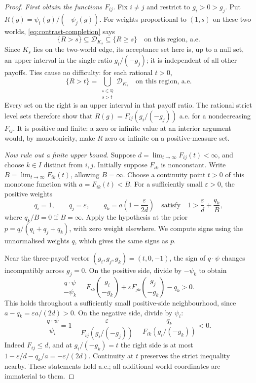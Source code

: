 \documentclass[11pt]{article}
\theoremstyle{remark}
\newcommand{\Dscr}{\mathcal D}
\begin{document}
\begin{proof}
\emph{First obtain the functions $F_{ij}$.}
Fix $i\ne j$ and restrict to $g_i>0>g_j$. Put
$R(g)=\psi_i(g)/(-\psi_j(g))$.
For weights proportional to $(1,s)$ on these two worlds,
\eqref{eq:contrast-completion} says
\[
 \{R>s\}\subseteq\Dscr_{K_s}\subseteq\{R\ge s\}
 \quad\text{on this region, a.e.}
\]
Since $K_s$ lies on the two-world edge, its acceptance set here is, up to a
null set, an upper interval in the single ratio $g_i/(-g_j)$; it is
independent of all other payoffs. Ties cause no difficulty: for each
rational $t>0$,
\[
 \{R>t\}=\bigcup_{\substack{s\in\mathbb Q\\s>t}}\Dscr_{K_s}
 \quad\text{on this region, a.e.}
\]
Every set on the right is an upper interval in that payoff ratio.
The rational strict level sets therefore show that
$R(g)=F_{ij}(g_i/(-g_j))$ a.e. for a nondecreasing $F_{ij}$.
It is positive and finite: a zero or infinite value at an interior argument
would, by monotonicity, make $R$ zero or infinite on a positive-measure set.

\emph{Now rule out a finite upper bound.}
Suppose $d=\lim_{t\to\infty}F_{ij}(t)<\infty$, and choose $k\in I$ distinct
from $i,j$. Initially suppose $F_{ik}$ is nonconstant. Write
$B=\lim_{t\to\infty}F_{ik}(t)$, allowing $B=\infty$.
Choose a continuity point $t>0$ of this monotone function with
$a=F_{ik}(t)<B$. For a sufficiently small $\varepsilon>0$, the positive
weights
\begin{equation}
 q_i=1,\qquad q_j=\varepsilon,\qquad
 q_k=a\left(1-\frac{\varepsilon}{2d}\right)
 \quad\text{satisfy}\quad
 1>\frac{\varepsilon}{d}+\frac{q_k}{B},
 \label{eq:three-weights}
\end{equation}
where $q_k/B=0$ if $B=\infty$. Apply the hypothesis at the prior
$p=q/(q_i+q_j+q_k)$, with zero weight elsewhere. We compute signs using
the unnormalised weights $q$, which gives the same signs as $p$.

Near the three-payoff vector $(g_i,g_j,g_k)=(t,0,-1)$, the sign of
$q\cdot\psi$ changes incompatibly across $g_j=0$. On the positive side,
divide by $-\psi_k$ to obtain
\[
 \frac{q\cdot\psi}{-\psi_k}
 =F_{ik}\!\left(\frac{g_i}{-g_k}\right)
   +\varepsilon F_{jk}\!\left(\frac{g_j}{-g_k}\right)-q_k>0.
\]
This holds throughout a sufficiently small positive-side neighbourhood,
since $a-q_k=\varepsilon a/(2d)>0$.
On the negative side, divide by $\psi_i$:
\[
 \frac{q\cdot\psi}{\psi_i}
 =1-\frac{\varepsilon}{F_{ij}(g_i/(-g_j))}
     -\frac{q_k}{F_{ik}(g_i/(-g_k))}<0.
\]
Indeed $F_{ij}\le d$, and at $g_i/(-g_k)=t$ the right side is at most
$1-\varepsilon/d-q_k/a=-\varepsilon/(2d)$. Continuity at $t$ preserves
the strict inequality nearby. These statements hold a.e.; all additional
world coordinates are immaterial to them.


\end{proof}
\end{document}
